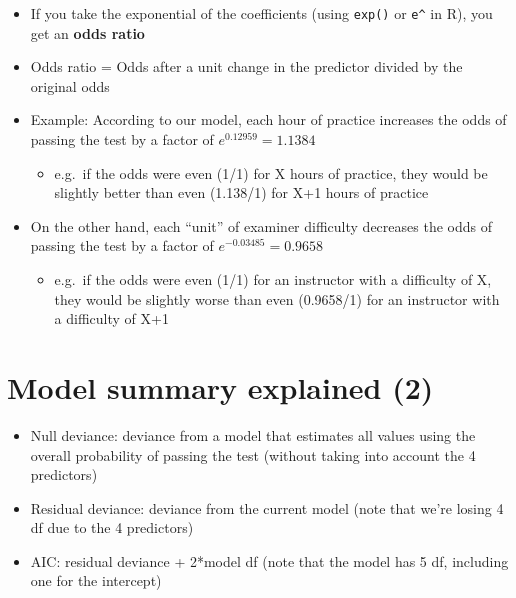 \documentclass[]{article}
\begin{document}
\begin{itemize}
\itemsep1pt\parskip0pt
\item
  If you take the exponential of the coefficients (using \texttt{exp()}
  or \texttt{e\^{}} in R), you get an \textbf{odds ratio}
\item
  Odds ratio = Odds after a unit change in the predictor divided by the
  original odds
\item
  Example: According to our model, each hour of practice increases the
  odds of passing the test by a factor of $e^{0.12959} = 1.1384$

  \begin{itemize}
  \itemsep1pt\parskip0pt
  \item
    e.g.~if the odds were even (1/1) for X hours of practice, they would
    be slightly better than even (1.138/1) for X+1 hours of practice
  \end{itemize}
\item
  On the other hand, each ``unit'' of examiner difficulty decreases the
  odds of passing the test by a factor of $e^{-0.03485} = 0.9658$

  \begin{itemize}
  \itemsep1pt\parskip0pt
  \item
    e.g.~if the odds were even (1/1) for an instructor with a difficulty
    of X, they would be slightly worse than even (0.9658/1) for an
    instructor with a difficulty of X+1
  \end{itemize}
\end{itemize}

\section{Model summary explained (2)}\label{model-summary-explained-2-1}

\begin{itemize}
\itemsep1pt\parskip0pt
\item
  Null deviance: deviance from a model that estimates all values using
  the overall probability of passing the test (without taking into
  account the 4 predictors)
\item
  Residual deviance: deviance from the current model (note that we're
  losing 4 df due to the 4 predictors)
\item
  AIC: residual deviance + 2*model df (note that the model has 5 df,
  including one for the intercept)
\end{itemize}
\end{document}
